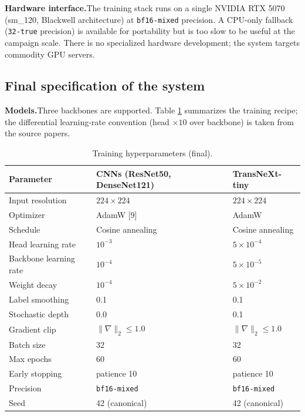 \textbf{Hardware interface.}\quad The training stack runs on a single NVIDIA
RTX 5070 (sm\_120, Blackwell architecture) at \texttt{bf16-mixed} precision.
A CPU-only fallback (\texttt{32-true} precision) is available for portability
but is too slow to be useful at the campaign scale. There is no specialized
hardware development; the system targets commodity GPU servers.

\subsection{Final specification of the system}
\textbf{Models.}\quad Three backbones are supported. Table \ref{tab:hparams}
summarizes the training recipe; the differential learning-rate convention
(head $\times 10$ over backbone) is taken from the source papers.

\begin{table}[htbp]
\centering
\caption{Training hyperparameters (final).}
\label{tab:hparams}
\setlength{\tabcolsep}{4pt}
\renewcommand{\arraystretch}{1.1}
\begin{tabular}{lll}
\toprule
Parameter & CNNs (ResNet50, DenseNet121) & TransNeXt-tiny \\
\midrule
Input resolution        & $224 \times 224$        & $224 \times 224$ \\
Optimizer               & AdamW [9] & AdamW \\
Schedule                & Cosine annealing        & Cosine annealing \\
Head learning rate      & $10^{-3}$               & $5 \times 10^{-4}$ \\
Backbone learning rate  & $10^{-4}$               & $5 \times 10^{-5}$ \\
Weight decay            & $10^{-4}$               & $5 \times 10^{-2}$ \\
Label smoothing         & 0.1                     & 0.1 \\
Stochastic depth        & 0.0                     & 0.1 \\
Gradient clip           & $\|\nabla\|_2 \leq 1.0$ & $\|\nabla\|_2 \leq 1.0$ \\
Batch size              & 32                      & 32 \\
Max epochs              & 60                      & 60 \\
Early stopping          & patience 10             & patience 10 \\
Precision               & \texttt{bf16-mixed}     & \texttt{bf16-mixed} \\
Seed                    & 42 (canonical)          & 42 (canonical) \\
\bottomrule
\end{tabular}
\end{table}

